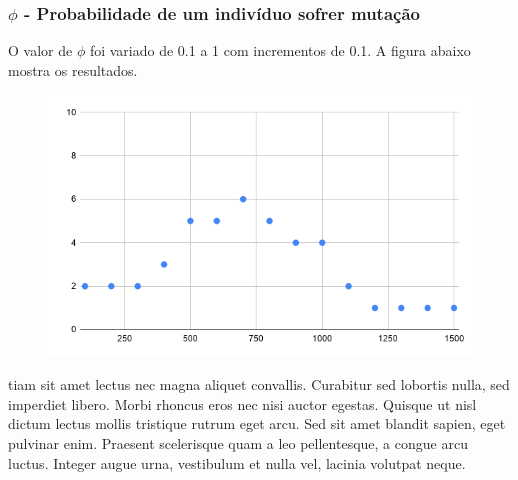 \documentclass{article}
\begin{document}
\subsubsection{$\phi$ - Probabilidade de um indivíduo sofrer mutação}
\quad O valor de $\phi$ foi variado de 0.1 a 1 com incrementos de 0.1. A figura abaixo mostra os resultados.
\begin{figure}[H]
\centering
\includegraphics[scale=0.35]{placeholder}
\end{figure}
\quad tiam sit amet lectus nec magna aliquet convallis. Curabitur sed lobortis nulla, sed imperdiet libero. Morbi rhoncus eros nec nisi auctor egestas. Quisque ut nisl dictum lectus mollis tristique rutrum eget arcu. Sed sit amet blandit sapien, eget pulvinar enim. Praesent scelerisque quam a leo pellentesque, a congue arcu luctus. Integer augue urna, vestibulum et nulla vel, lacinia volutpat neque.
\end{document}
